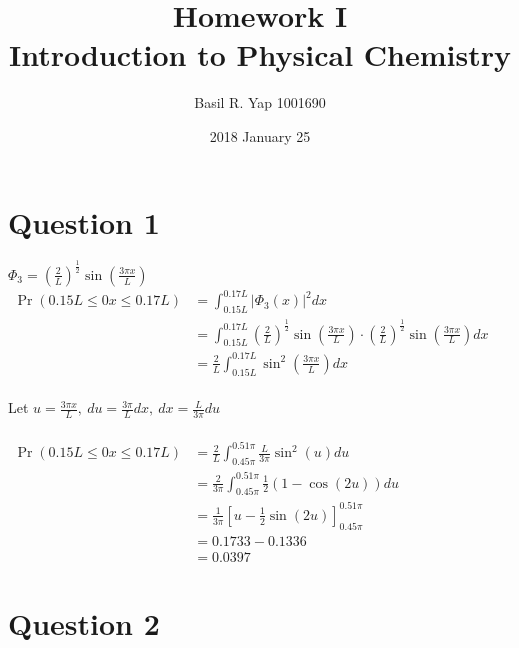 \documentclass[a4paper, fleqn]{article}
\begin{document}
\title{Homework I \\ Introduction to Physical Chemistry}
\author{Basil R. Yap 1001690}
\date{2018 January 25}
\maketitle

\section{Question 1}

$\Phi_3 = \left(\frac{2}{L}\right)^{\frac{1}{2}}\sin\left(\frac{3\pi x}{L}\right)$\\
$\begin{aligned}\Pr(0.15L\leq0x\leq0.17L)&=\int_{0.15L}^{0.17L}\left|\Phi_3(x)\right|^2dx\\&=\int_{0.15L}^{0.17L}\left(\frac{2}{L}\right)^{\frac{1}{2}}\sin\left(\frac{3\pi x}{L}\right)\cdot\left(\frac{2}{L}\right)^{\frac{1}{2}}\sin\left(\frac{3\pi x}{L}\right)dx\\&=\frac{2}{L}\int_{0.15L}^{0.17L}\sin^2\left(\frac{3\pi x}{L}\right)dx\end{aligned}$\\
\\
Let $u=\frac{3\pi x}{L},\ du=\frac{3\pi}{L}dx,\ dx=\frac{L}{3\pi}du$\\
\\
$\begin{aligned}\Pr(0.15L\leq0x\leq0.17L)&=\frac{2}{L}\int_{0.45\pi}^{0.51\pi}\frac{L}{3\pi}\sin^2(u)du\\&=\frac{2}{3\pi}\int_{0.45\pi}^{0.51\pi}\frac{1}{2}(1-\cos(2u))du\\&=\frac{1}{3\pi}\left[u-\frac{1}{2}\sin(2u)\right]_{0.45\pi}^{0.51\pi}\\&=0.1733-0.1336\\&=0.0397\end{aligned}$\\

\pagebreak

\section{Question 2}
\end{document}
